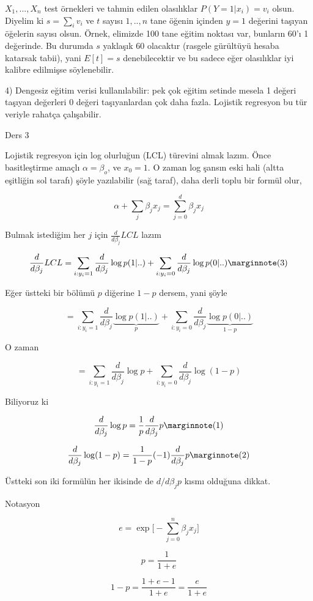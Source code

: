 \documentclass[12pt,fleqn]{article}\usepackage{../../common}
\begin{document}
$X_1,...,X_n$ test örnekleri ve tahmin edilen olasılıklar $P(Y=1 | x_i) = v_i$ 
olsun. Diyelim ki $s = \sum_i v_i$ ve $t$ sayısı $1,..,n$ tane öğenin
içinden $y = 1$ değerini taşıyan öğelerin sayısı olsun. Örnek, elimizde 100
tane eğitim noktası var, bunların 60'ı 1 değerinde. Bu durumda $s$ yaklaşık
60 olacaktır (rasgele gürültüyü hesaba katarsak tabii), yani  $E[t] = s$ 
denebilecektir ve bu sadece eğer olasılıklar iyi kalibre edilmişse
söylenebilir.

4) Dengesiz eğitim verisi kullanılabilir: pek çok eğitim setinde mesela 1
değeri taşıyan değerleri 0 değeri taşıyanlardan çok daha fazla. Lojistik
regresyon bu tür veriyle rahatça çalışabilir.
 
Ders 3

Lojistik regresyon için log olurluğun (LCL) türevini almak lazım. Önce
basitleştirme amaçlı $\alpha = \beta_o$, ve $x_0 = 1$. O zaman log şansın
eski hali (altta eşitliğin sol tarafı) şöyle yazılabilir (sağ taraf), daha
derli toplu bir formül olur,

$$ \alpha + \sum_j \beta_j x_j  = \sum_{j=0}^{d} \beta_j x_j $$ 

Bulmak istediğim her $j$ için $\frac{d}{d\beta_j} LCL$ lazım

$$ 
\frac{d}{d\beta_j} LCL = 
\sum _{i:y_i=1} \frac{d}{d\beta_j} \log p(1|..)
+ \sum _{i:y_i=0} \frac{d}{d\beta_j} \log p(0|..)
\mlabel{3}
$$

Eğer üstteki bir bölümü $p$ diğerine $1-p$ dersem, yani şöyle

$$ 
= \sum _{i:y_i=1} \frac{d}{d\beta_j} \underbrace{\log p(1|..)}_{p}
+ \sum _{i:y_i=0} \frac{d}{d\beta_j} \underbrace{\log p(0|..)}_{1-p}
$$

O zaman 


$$ 
= \sum _{i:y_i=1} \frac{d}{d\beta_j}\log p
+ \sum _{i:y_i=0} \frac{d}{d\beta_j} \log (1-p)
$$

Biliyoruz ki

$$ 
\frac{d}{d\beta_j}\log p = \frac{1}{p}\frac{d}{d\beta_j} p
\mlabel{1}
$$

$$ 
\frac{d}{d\beta_j}\log (1-p) = \frac{1}{1-p}(-1)\frac{d}{d\beta_j} p
\mlabel{2}
$$

Üstteki son iki formülün her ikisinde de $d/d\beta_j p$ kısmı olduğuna dikkat.

Notasyon

$$ e = \exp \big[ - \sum_{j=0}^n \beta_jx_j \big] $$

$$ p = \frac{ 1}{1+e} $$

$$ 1-p = \frac{ 1+e-1}{1+e} = \frac{ e}{1+e} $$
\end{document}
